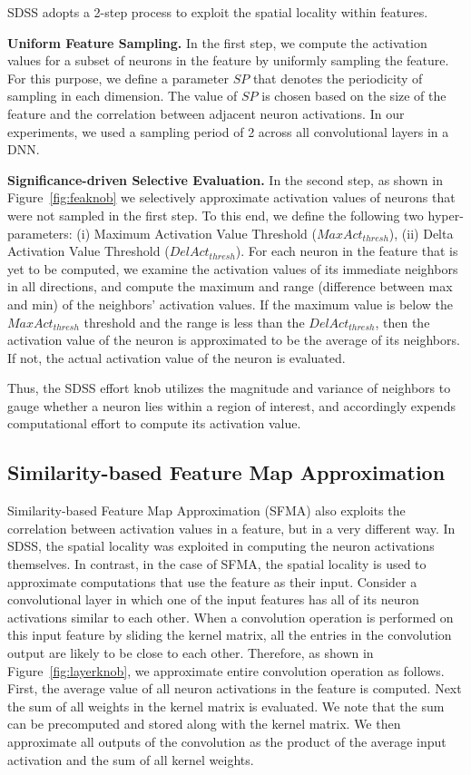 \documentclass{article} %
\begin{document}
SDSS adopts a 2-step process to exploit the spatial locality within features. 

{\bf Uniform Feature Sampling.} In the first step, we  compute the activation values for a subset of neurons in the feature by uniformly sampling the feature. For this purpose, we define a parameter $SP$ that denotes the periodicity of sampling in each dimension. The value of $SP$ is chosen based on the size of the feature and the correlation between adjacent neuron activations. In our experiments, we used a sampling period of 2 across all convolutional layers in a DNN.

{\bf Significance-driven Selective Evaluation.} In the second step, as shown in Figure~\ref{fig:feaknob} we selectively approximate activation values of neurons that were not sampled in the first step. To this end, we define the following two hyper-parameters: (i) Maximum Activation Value Threshold ($MaxAct_{thresh}$), (ii) Delta Activation Value Threshold ($DelAct_{thresh}$). For each neuron in the feature that is yet to be computed, we examine the activation values of its immediate neighbors in all directions, and compute the maximum and range (difference between max and min) of the neighbors' activation values. If the maximum value is below the $MaxAct_{thresh}$ threshold and the range is less than the $DelAct_{thresh}$, then the activation value of the neuron is approximated to be the average of its neighbors. If not, the actual activation value of the neuron is evaluated.

Thus, the SDSS effort knob utilizes the magnitude and variance of neighbors to gauge whether a neuron lies within a region of interest, and accordingly expends computational effort to compute its activation value.

\subsection{Similarity-based Feature Map Approximation}

Similarity-based Feature Map Approximation (SFMA) also exploits the correlation between activation values in a feature, but in a very different way. In SDSS, the spatial locality was exploited in computing the neuron activations themselves. In contrast, in the case of SFMA, the spatial locality is used to approximate computations that use the feature as their input. 
Consider a convolutional layer in which one of the input features has all of its neuron activations similar to each other. When a convolution operation is performed on this input feature by sliding the kernel matrix, all the entries in the convolution output are likely to be close to each other. Therefore, as shown in Figure~\ref{fig:layerknob}, we approximate entire convolution operation as follows. First, the average value of all neuron activations in the feature is computed. Next the sum of all weights in the kernel matrix is evaluated. We note that the sum can be precomputed and stored along with the kernel matrix. We then approximate all outputs of the convolution as the product of the average input activation and the sum of all kernel weights.
\end{document}
